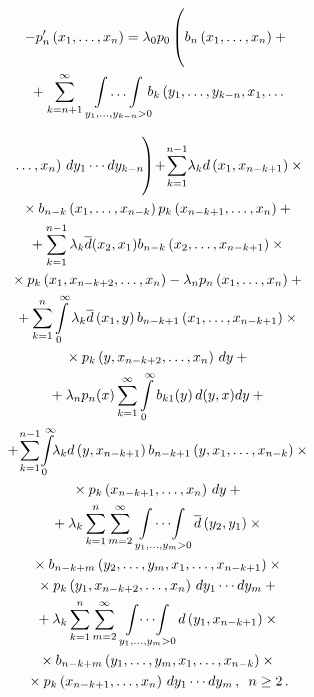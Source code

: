\begin{multicols}{2}
\vspace*{-12pt}

\noindent
\begin{multline*}
-p'_n\left(x_1,\ld,x_n\right)
=  \lambda_0 p_0 \left(
\vphantom{\mathop{\int\!\cdots\!\int}\limits_{y_1,\ld,y_{k-1}>0}\sum\limits^\infty}
b_n\left(x_1,\ld,x_n\right) +{}\right.\\
{}+ \sum\limits_{k=n+1}^\infty
\mathop{\int\ld\int}\limits_{y_1,\ld,y_{k-n}>0}\!\!\!
b_k\left(y_1,\ld,y_{k-n},x_1,\ld\right.
\end{multline*}

\noindent
\begin{multline}
\left.\left.{}\ld,x_{n}\right)\, dy_1\cdots dy_{k-n}
\vphantom{\mathop{\int\!\cdots\!\int}\limits_{y_1,\ld,y_{k-1}>0}\sum\limits^\infty}
\!\right)\!
+\!
\sum\limits_{k=1}^{n-1}\! \lambda_k d\left(x_1,x_{n-k+1}\right) 
\times{}\\
{}\times b_{n-k}\left(x_1,\ld,x_{n-k}\right) p_k\left(x_{n-k+1},\ld,x_{n}\right)
+{}
\\
{}+
 \sum\limits_{k=1}^{n-1} \lambda_k \d(x_2,x_{1})
b_{n-k}\left(x_2,\ld,x_{n-k+1}\right)\times{}\\
{}\times
p_k\left(x_1,x_{n-k+2},\ld,x_{n}\right) -
\lambda_n p_n\left(x_1,\ld,x_n\right) +{}
\\
{}+
 \sum\limits_{k=1}^{n} \int\limits_0^\infty \lambda_k
\d\left(x_{1},y\right) b_{n-k+1}\left(x_1,\ld,x_{n-k+1}\right)\times{}\\
{}\times
p_k\left(y,x_{n-k+2},\ld,x_{n}\right)\, dy +{}
\\
{}+
\lambda_n p_n(x) \sum\limits_{k=1}^\infty
\int\limits_0^\infty b_{k1}(y)\, d(y,x) dy
+{}
\\
{}+\!
\sum\limits_{k=1}^{n-1}\! \int\limits_0^\infty\!\! \lambda_k 
d\left(y,x_{n-k+1}\right)
b_{n-k+1}\left(y,x_1,\ld,x_{n-k}\right)\times{}\\
{}\times
p_k\left(x_{n-k+1},\ld,x_{n}\right)\, dy
+{}
\\
{}+
\lambda_k \sum\limits_{k=1}^{n}
\sum\limits_{m=2}^{\infty}
\mathop{\!\int\cdots\!\int}\limits_{y_1,\ld,y_{m}>0}
\d\left(y_2,y_{1}\right)\times{}\\
{}\times
b_{n-k+m}\left(y_2,\ld,y_m,x_1,\ld,x_{n-k+1}\right)\times{}\\
{}\times
p_k\left(y_1,x_{n-k+2},\ld,x_{n}\right)\, dy_1\cdots dy_m
+{}
\\
{}+
\lambda_k \sum\limits_{k=1}^{n}
\sum\limits_{m=2}^{\infty}
\mathop{\int\!\cdots\!\int}\limits_{y_1,\ld,y_{m}>0}
d\left(y_1,x_{n-k+1}\right)\times{}\\
{}\times
b_{n-k+m}\left(y_1,\ld,y_m,x_1,\ld,x_{n-k}\right)\times{}\\
{}\times
p_k\left(x_{n-k+1},\ld,x_{n}\right)\, dy_1\cdots dy_m\,,
\enskip
n\ge2\,.
\label{e2}
\end{multline}




\end{multicols}
